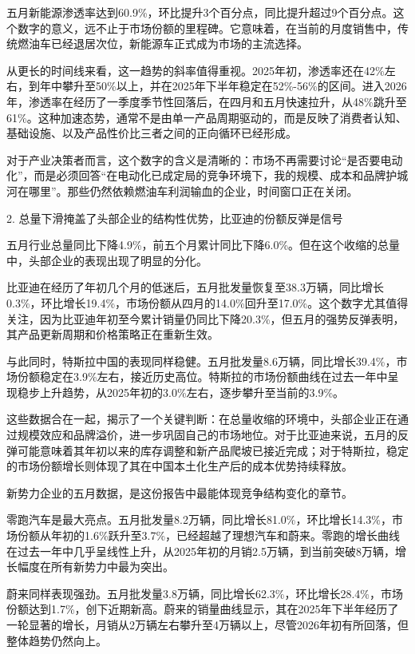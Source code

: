 \documentclass[11pt]{ctexart}
\begin{document}
五月新能源渗透率达到60.9\%，环比提升3个百分点，同比提升超过9个百分点。这个数字的意义，远不止于市场份额的里程碑。它意味着，在当前的月度销售中，传统燃油车已经退居次位，新能源车正式成为市场的主流选择。

从更长的时间线来看，这一趋势的斜率值得重视。2025年初，渗透率还在42\%左右，到年中攀升至50\%以上，并在2025年下半年稳定在52\%-56\%的区间。进入2026年，渗透率在经历了一季度季节性回落后，在四月和五月快速拉升，从48\%跳升至61\%。这种加速态势，通常不是由单一产品周期驱动的，而是反映了消费者认知、基础设施、以及产品性价比三者之间的正向循环已经形成。

对于产业决策者而言，这个数字的含义是清晰的：市场不再需要讨论“是否要电动化”，而是必须回答“在电动化已成定局的竞争环境下，我的规模、成本和品牌护城河在哪里”。那些仍然依赖燃油车利润输血的企业，时间窗口正在关闭。

2. 总量下滑掩盖了头部企业的结构性优势，比亚迪的份额反弹是信号

五月行业总量同比下降4.9\%，前五个月累计同比下降6.0\%。但在这个收缩的总量中，头部企业的表现出现了明显的分化。

比亚迪在经历了年初几个月的低迷后，五月批发量恢复至38.3万辆，同比增长0.3\%，环比增长19.4\%，市场份额从四月的14.0\%回升至17.0\%。这个数字尤其值得关注，因为比亚迪年初至今累计销量仍同比下降20.3\%，但五月的强势反弹表明，其产品更新周期和价格策略正在重新生效。

与此同时，特斯拉中国的表现同样稳健。五月批发量8.6万辆，同比增长39.4\%，市场份额稳定在3.9\%左右，接近历史高位。特斯拉的市场份额曲线在过去一年中呈现稳步上升趋势，从2025年初的3.0\%左右，逐步攀升至当前的3.9\%。

这些数据合在一起，揭示了一个关键判断：在总量收缩的环境中，头部企业正在通过规模效应和品牌溢价，进一步巩固自己的市场地位。对于比亚迪来说，五月的反弹可能意味着其年初以来的库存调整和新产品爬坡已接近完成；对于特斯拉，稳定的市场份额增长则体现了其在中国本土化生产后的成本优势持续释放。

新势力企业的五月数据，是这份报告中最能体现竞争结构变化的章节。

零跑汽车是最大亮点。五月批发量8.2万辆，同比增长81.0\%，环比增长14.3\%，市场份额从年初的1.6\%跃升至3.7\%，已经超越了理想汽车和蔚来。零跑的增长曲线在过去一年中几乎呈线性上升，从2025年初的月销2.5万辆，到当前突破8万辆，增长幅度在所有新势力中最为突出。

蔚来同样表现强劲。五月批发量3.8万辆，同比增长62.3\%，环比增长28.4\%，市场份额达到1.7\%，创下近期新高。蔚来的销量曲线显示，其在2025年下半年经历了一轮显著的增长，月销从2万辆左右攀升至4万辆以上，尽管2026年初有所回落，但整体趋势仍然向上。
\end{document}
